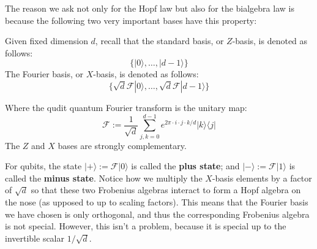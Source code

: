 The reason we ask not only for the Hopf law but also for the bialgebra law is  because the following two very important bases have this property:
\begin{example}
Given fixed dimension $d$, recall that the standard basis, or $Z$-basis,  is denoted as follows:
$$\{ |0\rangle, \ldots, |d-1\rangle \}$$
The Fourier basis, or $X$-basis, is denoted as follows:
$$\{\sqrt{d} \mathcal{F}|0\rangle, \ldots, \sqrt{d}\mathcal{F}|d-1\rangle \}$$

Where the qudit quantum Fourier transform is the unitary map:
$$\mathcal{F} := \dfrac{1}{\sqrt{d}} \sum_{j,k=0}^{d-1} e^{2\pi\cdot i \cdot j \cdot k/d} | k\rangle \langle j | $$
The $Z$ and $X$ bases are strongly complementary.
\end{example}
For qubits, the  state $|+\rangle:=\mathcal{F}|0\rangle$ is called the {\bf plus state}; and  $|-\rangle:=\mathcal{F}|1\rangle$ is called the {\bf minus state}.
Notice how we multiply the $X$-basis elements by a factor of $\sqrt d$ so that these two Frobenius algebras interact to form a Hopf algebra on the nose (as upposed to up to scaling factors).  This means that the Fourier basis we have chosen is only orthogonal, and thus the corresponding Frobenius algebra is not special.  However, this isn't a problem, because it is special up to the invertible  scalar $1/\sqrt{d}$.

